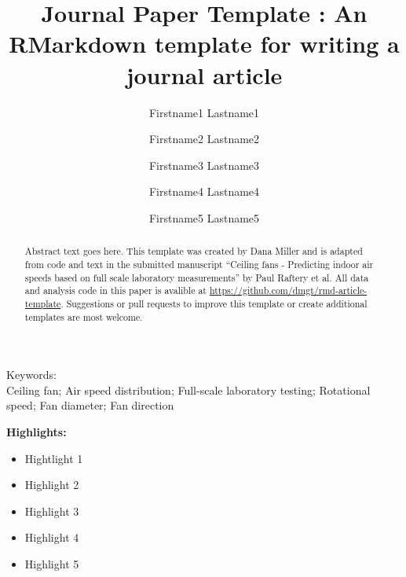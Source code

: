 \documentclass[]{elsarticle} %
\providecommand{\tightlist}{%
  \setlength{\itemsep}{0pt}\setlength{\parskip}{0pt}}
\begin{document}
\begin{frontmatter}

  \title{Journal Paper Template : An RMarkdown template for writing a journal
article}
    \author[CBE]{Firstname1 Lastname1}
    \author[Manufacturer]{Firstname2 Lastname2}
  
  
    \author[Visiting]{Firstname3 Lastname3}
  
  
    \author[CBE]{Firstname4 Lastname4}
  
  
    \author[Consultant]{Firstname5 Lastname5}
  
  
      \address[CBE]{Center for the Built Environment, UC Berkeley, 390 Wurster Hall,
Berkeley, CA, 94720, USA}
    \address[Manufacturer]{Collaborating Manufacturer, 1234 Innovation Dr, Lexington, KY 12345, USA}
    \address[Visiting]{Dept. of Environment Science and Engineering, Daxue University, 123
Xuexiao Road, Tianjin, 123456, China}
    \address[Consultant]{Consulting company, 123 54th St, Oakland, CA, 12345, USA}
  
  \begin{abstract}
  Abstract text goes here. This template was created by Dana Miller and is
  adapted from code and text in the submitted manuscript ``Ceiling fans -
  Predicting indoor air speeds based on full scale laboratory
  measurements'' by Paul Raftery et al. All data and analysis code in this
  paper is avalible at \url{https://github.com/dmgt/rmd-article-template}.
  Suggestions or pull requests to improve this template or create
  additional templates are most welcome.
  \end{abstract}
  
 \end{frontmatter}

Keywords:\\
Ceiling fan; Air speed distribution; Full-scale laboratory testing;
Rotational speed; Fan diameter; Fan direction

\pagebreak

\textbf{Highlights:}

\begin{itemize}
\tightlist
\item
  Hightlight 1
\item
  Highlight 2
\item
  Highlight 3
\item
  Highlight 4
\item
  Highlight 5
\end{itemize}
\end{document}
